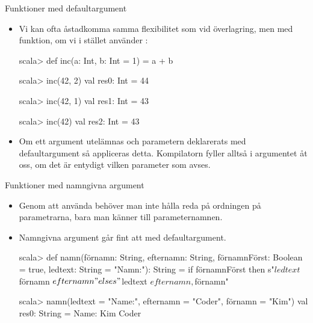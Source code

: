 \begin{Slide}{Funktioner med defaultargument}\SlideFontSmall

\begin{itemize}
\item Vi kan ofta åstadkomma samma flexibilitet som vid överlagring, men med  funktion, om vi i stället använder :
\begin{REPLnonum}
scala> def inc(a: Int, b: Int = 1) = a + b

scala> inc(42, 2)
val res0: Int = 44

scala> inc(42, 1)
val res1: Int = 43

scala> inc(42)
val res2: Int = 43

\end{REPLnonum}
\item Om ett argument utelämnas och parametern deklarerats med defaultargument så appliceras detta. Kompilatorn fyller alltså i argumentet åt oss, om det är entydigt vilken parameter som avses.
\end{itemize}
\end{Slide}


\begin{Slide}{Funktioner med namngivna argument}
\begin{itemize}
\item Genom att använda  behöver man inte hålla reda på ordningen på parametrarna, bara man känner till parameternamnen.
\item Namngivna argument går fint att  med defaultargument.
\begin{REPLnonum}[basicstyle=\SlideFontSize{7}{9}\ttfamily\color{white}]
scala> def namn(förnamn: String,
                efternamn: String,
                förnamnFörst: Boolean = true,
                ledtext: String = "Namn:"): String =
         if förnamnFörst then s"$ledtext $förnamn $efternamn"
         else s"$ledtext $efternamn, $förnamn"

scala> namn(ledtext = "Name:", efternamn = "Coder", förnamn = "Kim")
val res0: String = Name: Kim Coder
\end{REPLnonum}
\end{itemize}
\end{Slide}


